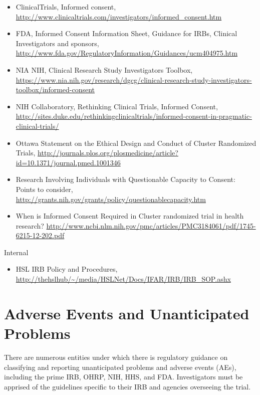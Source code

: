 \documentclass[]{book}
\providecommand{\tightlist}{%
  \setlength{\itemsep}{0pt}\setlength{\parskip}{0pt}}
\begin{document}
\begin{itemize}
\item
  ClinicalTrials, Informed consent,
  \url{http://www.clinicaltrials.com/investigators/informed_consent.htm}
\item
  FDA, Informed Consent Information Sheet, Guidance for IRBs, Clinical
  Investigators and sponsors,
  \url{http://www.fda.gov/RegulatoryInformation/Guidances/ucm404975.htm}
\item
  NIA NIH, Clinical Research Study Investigators Toolbox,
  \url{https://www.nia.nih.gov/research/dgcg/clinical-research-study-investigators-toolbox/informed-consent}
\item
  NIH Collaboratory, Rethinking Clinical Trials, Informed Consent,
  \url{http://sites.duke.edu/rethinkingclinicaltrials/informed-consent-in-pragmatic-clinical-trials/}
\item
  Ottawa Statement on the Ethical Design and Conduct of Cluster
  Randomized Trials,
  \url{http://journals.plos.org/plosmedicine/article?id=10.1371/journal.pmed.1001346}
\item
  Research Involving Individuals with Questionable Capacity to Consent:
  Points to consider,
  \url{http://grants.nih.gov/grants/policy/questionablecapacity.htm}
\item
  When is Informed Consent Required in Cluster randomized trial in
  health research?
  \url{http://www.ncbi.nlm.nih.gov/pmc/articles/PMC3184061/pdf/1745-6215-12-202.pdf}
\end{itemize}

Internal

\begin{itemize}
\tightlist
\item
  HSL IRB Policy and Procedures,
  \url{http://thehslhub/~/media/HSLNet/Docs/IFAR/IRB/IRB_SOP.ashx}
\end{itemize}

\section{Adverse Events and Unanticipated
Problems}\label{adverse-events-and-unanticipated-problems}

There are numerous entities under which there is regulatory guidance on
classifying and reporting unanticipated problems and adverse events
(AEs), including the prime IRB, OHRP, NIH, HHS, and FDA. Investigators
must be apprised of the guidelines specific to their IRB and agencies
overseeing the trial.
\end{document}
